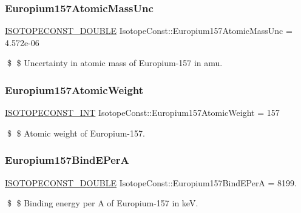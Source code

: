\subsubsection{\texorpdfstring{Europium157\+Atomic\+Mass\+Unc}{Europium157AtomicMassUnc}}
{\footnotesize\ttfamily \mbox{\hyperlink{group___isotope_const-_macros_ga8f45a7272ce02c0b4c65c44636ed719a}{I\+S\+O\+T\+O\+P\+E\+C\+O\+N\+S\+T\+\_\+\+D\+O\+U\+B\+LE}} Isotope\+Const\+::\+Europium157\+Atomic\+Mass\+Unc = 4.\+572e-\/06}

\$ \$ Uncertainty in atomic mass of Europium-\/157 in amu. \mbox{\label{group___isotope_const-_europium-_eu157_gae1608d486f69ae2bc51f45d092a9e472}} 
\subsubsection{\texorpdfstring{Europium157\+Atomic\+Weight}{Europium157AtomicWeight}}
{\footnotesize\ttfamily \mbox{\hyperlink{group___isotope_const-_macros_ga5f18360b3e99483a35c32d789e62621c}{I\+S\+O\+T\+O\+P\+E\+C\+O\+N\+S\+T\+\_\+\+I\+NT}} Isotope\+Const\+::\+Europium157\+Atomic\+Weight = 157}

\$ \$ Atomic weight of Europium-\/157. \mbox{\label{group___isotope_const-_europium-_eu157_ga6a8805d9fc0d9a72b785c12125edfd7e}} 
\subsubsection{\texorpdfstring{Europium157\+Bind\+E\+PerA}{Europium157BindEPerA}}
{\footnotesize\ttfamily \mbox{\hyperlink{group___isotope_const-_macros_ga8f45a7272ce02c0b4c65c44636ed719a}{I\+S\+O\+T\+O\+P\+E\+C\+O\+N\+S\+T\+\_\+\+D\+O\+U\+B\+LE}} Isotope\+Const\+::\+Europium157\+Bind\+E\+PerA = 8199.}

\$ \$ Binding energy per A of Europium-\/157 in keV. \mbox{\label{group___isotope_const-_europium-_eu157_ga6a4ebd8944be7c561fc3c9d78842368f}} 
